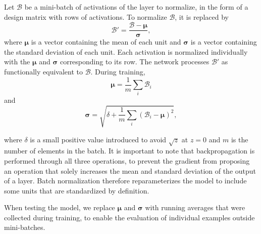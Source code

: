 Let $\mathcal{B}$ be a mini-batch of activations of the layer to normalize, in the form of a design matrix with rows of activations. To normalize $\mathcal{B}$, it is replaced by
\begin{equation}
    \mathcal{B}' = \frac{\mathcal{B} - \boldsymbol{\mu}}{\boldsymbol{\sigma}},
\end{equation}
where $\boldsymbol{\mu}$ is a vector containing the mean of each unit and $\boldsymbol{\sigma}$ is a vector containing the standard deviation of each unit. Each activation is normalized individually with the $\boldsymbol{\mu}$ and $\boldsymbol{\sigma}$ corresponding to its row. The network processes $\mathcal{B}'$ as functionally equivalent to $\mathcal{B}$. During training,
\begin{equation}
    \boldsymbol{\mu} = \frac{1}{m}\sum_i \mathcal{B}_i
\end{equation}
and
\begin{equation}
    \boldsymbol{\sigma} = \sqrt{\delta + \frac{1}{m} \sum_i (\mathcal{B}_i - \boldsymbol{\mu})^2},
\end{equation}

where $\delta$ is a small positive value introduced to avoid $\sqrt{z}$ at $z = 0$ and $m$ is the number of elements in the batch. It is important to note that backpropagation is performed through all three operations, to prevent the gradient from proposing an operation that solely increases the mean and standard deviation of the output of a layer. Batch normalization therefore reparameterizes the model to include some units that are standardized by definition.

When testing the model, we replace $\boldsymbol{\mu}$ and $\boldsymbol{\sigma}$ with running averages that were collected during training, to enable the evaluation of individual examples outside mini-batches.

